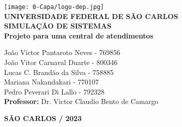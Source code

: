 \justifying %
\onehalfspacing %
\setlength{\parindent}{0cm}  %
\renewcommand*\familydefault{\rmdefault}
\thispagestyle{empty}
\begin{center}
\texttt{[image: 0-Capa/logo-dep.jpg]}\\
\vspace*{.8cm}
{\huge \textbf{UNIVERSIDADE FEDERAL DE SÃO CARLOS}}\\
\vspace*{.8cm}
{\Large \textbf{SIMULAÇÃO DE SISTEMAS}}\\
\vspace*{3cm}
{\Large \textbf{Projeto para uma central de atendimentos}}\\
\vspace*{4.5cm}
\begin{flushright}
    \onehalfspacing
    {\Large  João Victor Pantaroto Neves - 769856}\\
    {\Large  João Vitor Carnaval Duarte - 800346}\\
    {\Large  Lucas C. Brandão da Silva - 758885}\\
    {\Large  Mariana Nakandakari  - 770107}\\
    {\Large  Pedro Peverari Di Lallo  - 792328}\\
    \vspace*{.3cm}
    {\Large \textbf{Professor:}}
    {\Large Dr. Victor Claudio Bento de Camargo}\\
\end{flushright}
\vspace*{\fill}
{\large \bf SÃO CARLOS / 2023}
\end{center}